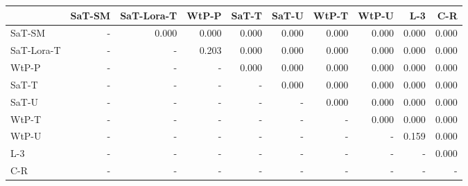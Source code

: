 \begin{tabular}{lrrrrrrrrr}
\toprule
 & SaT-SM & SaT-Lora-T & WtP-P & SaT-T & SaT-U & WtP-T & WtP-U & L-3 & C-R \\
\midrule
SaT-SM & - & 0.000 & 0.000 & 0.000 & 0.000 & 0.000 & 0.000 & 0.000 & 0.000 \\
SaT-Lora-T & - & - & 0.203 & 0.000 & 0.000 & 0.000 & 0.000 & 0.000 & 0.000 \\
WtP-P & - & - & - & 0.000 & 0.000 & 0.000 & 0.000 & 0.000 & 0.000 \\
SaT-T & - & - & - & - & 0.000 & 0.000 & 0.000 & 0.000 & 0.000 \\
SaT-U & - & - & - & - & - & 0.000 & 0.000 & 0.000 & 0.000 \\
WtP-T & - & - & - & - & - & - & 0.000 & 0.000 & 0.000 \\
WtP-U & - & - & - & - & - & - & - & 0.159 & 0.000 \\
L-3 & - & - & - & - & - & - & - & - & 0.000 \\
C-R & - & - & - & - & - & - & - & - & - \\
\bottomrule
\end{tabular}


